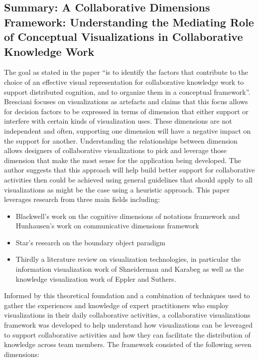 \documentclass{sig-alternate}
\begin{document}
\subsection{Summary: A Collaborative Dimensions Framework: Understanding the
Mediating Role of Conceptual Visualizations in Collaborative Knowledge Work
\cite{Bresciani:ACollaborativeDimensionsFramework}} The goal as stated in the
paper ``is to identify the factors that contribute to the choice of an effective
visual representation for collaborative knowledge work to support distributed
cognition, and to organize them in a conceptual framework''.  Bresciani  focuses
on visualizations as artefacts and claims that this focus allows for decision
factors to be expressed in terms of dimension that either support  or interfere 
with certain kinds of visualization uses. These dimensions are not independent
and often, supporting one dimension will have a negative impact on the support
for another. Understanding the relationships between dimension allows designers
of collaborative visualizations to pick and leverage those dimension that make
the most sense for the application being developed. The author suggests  that
this approach will help build better support for collaborative activities then
could be achieved using general guidelines that should apply to all
visualizations as might be the case using a heuristic approach. This paper
leverages research from three main fields including:

\begin{itemize}
  \item Blackwell's work on the cognitive dimensions of notations framework
  \cite{Blackwell:NotationalSystems} and Hunhausen's work on communicative 
 dimensions framework \cite{Hundhausen:CommunicativeDimensionsFramework}
  \item Star's research on the boundary object paradigm \cite{Star:BoundaryObjects}
  \item  Thirdly a literature review on visualization technologies, in
  particular the information visualization work of Shneiderman and Karabeg as
  well as the knowledge visualization work of Eppler and Suthers.

\end{itemize}
  
Informed by  this theoretical foundation and a combination of techniques used
to gather the experiences and knowledge of expert practitioners who employ
visualizations in their daily collaborative activities, a collaborative
visualizations framework was developed to help understand how visualizations can
be leveraged to support collaborative activities and how they can facilitate the
distribution of knowledge across team members. The framework consisted of the
following seven dimensions:
\end{document}
